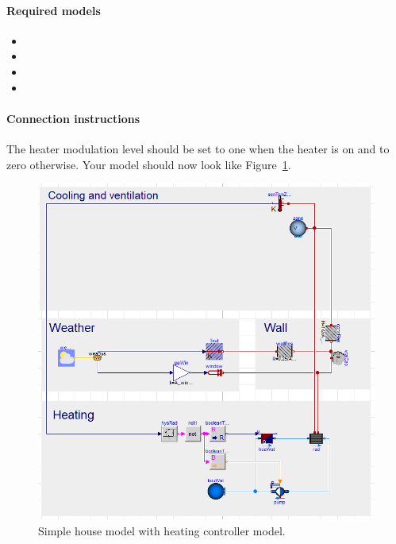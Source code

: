 \documentclass[10pt,a4paper]{article}
\begin{document}
\paragraph{Required models}
\begin{itemize}
\item {}
\item {}
\item {}
\item {}
\end{itemize}

\paragraph{Connection instructions}
The heater modulation level should be set to one when the heater is on and to zero otherwise. Your model should now look like Figure~\ref{fig:heatingControllerModel}.
\begin{figure}[h]
\centering
\includegraphics[scale=0.4]{img/heatingControllerModel.png}
\caption{Simple house model with heating controller model.}
\label{fig:heatingControllerModel}
\end{figure} 
\end{document}

